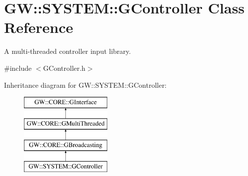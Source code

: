 \hypertarget{class_g_w_1_1_s_y_s_t_e_m_1_1_g_controller}{}\section{GW\+:\+:S\+Y\+S\+T\+EM\+:\+:G\+Controller Class Reference}
\label{class_g_w_1_1_s_y_s_t_e_m_1_1_g_controller}


A multi-\/threaded controller input library.  




{\ttfamily \#include $<$G\+Controller.\+h$>$}

Inheritance diagram for GW\+:\+:S\+Y\+S\+T\+EM\+:\+:G\+Controller\+:\begin{figure}[H]
\begin{center}
\leavevmode
\includegraphics[height=4.000000cm]{class_g_w_1_1_s_y_s_t_e_m_1_1_g_controller}
\end{center}
\end{figure}

